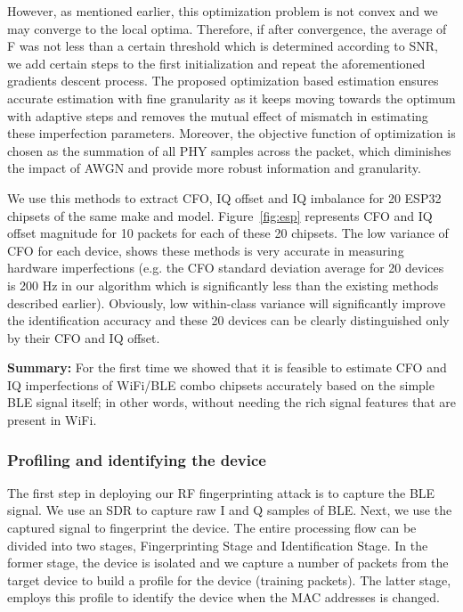 However, as mentioned earlier, this optimization problem is not convex and we may converge to the local optima. Therefore, if after convergence, the average of F was not less than a certain threshold which is determined according to SNR, we add certain steps to the first initialization and repeat the aforementioned gradients descent process. The proposed optimization based estimation ensures accurate estimation with fine granularity as it keeps moving towards the optimum with adaptive steps and removes the mutual effect of mismatch in estimating these imperfection parameters. Moreover, the objective function of optimization is chosen as the summation of all PHY samples across the packet, which diminishes the impact of AWGN and provide more robust information and granularity.

We use this methods to extract CFO, IQ offset and IQ imbalance for 20 ESP32 chipsets of the same make and model. Figure~\ref{fig:esp} represents CFO and IQ offset magnitude for 10 packets for each of these 20 chipsets. The low variance of CFO for each device, shows these methods is very accurate in measuring hardware imperfections (e.g. the CFO standard deviation average for 20 devices is 200 Hz in our algorithm which is significantly less than the existing methods described earlier). Obviously, low within-class variance will significantly improve the identification accuracy and these 20 devices can be clearly distinguished only by their CFO and IQ offset. 
\fi

\vspace{0.5em}
\noindent\textbf{Summary:} For the first time we showed that it is feasible to estimate CFO and IQ imperfections of WiFi/BLE combo chipsets accurately based on the simple BLE signal itself; in other words, without needing the rich signal features that are present in WiFi.


\subsubsection{Profiling and identifying the device}
\label{sec:methodology2}

The first step in deploying our RF fingerprinting attack is to capture the BLE signal. We use an SDR to capture raw I and Q samples of BLE. Next, we use the captured signal to fingerprint the device. The entire processing flow can be divided into two stages, Fingerprinting Stage and Identification Stage. In the former stage, the device is isolated and we capture a number of packets from the target device to build a profile for the device (training packets). The latter stage, employs this profile to identify the device when the MAC addresses is changed.

